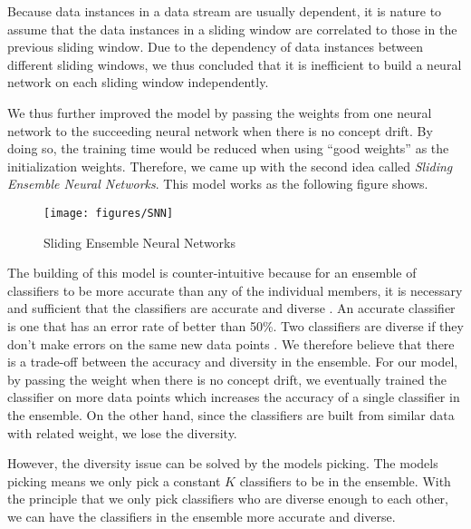 \documentclass[conference]{IEEEtran}
\begin{document}
		Because data instances in a data stream are usually dependent, it is nature to assume that the data instances in a sliding window are correlated to those in the previous sliding window.  Due to the dependency of data instances between different sliding windows, we thus concluded that it is inefficient to build a neural network on each sliding window independently.   
		
		We thus further improved the model by passing the weights from one neural network to the succeeding neural network when there is no concept drift. By doing so, the training time would be reduced when using ``good weights'' as the initialization weights.  Therefore, we came up with the second idea called \emph{Sliding Ensemble Neural Networks}. This model works as the following figure shows.
		
		
		\begin{figure}[H]
			\centering
			\texttt{[image: figures/SNN]}
			\caption{Sliding Ensemble Neural Networks}
			\label{fig:SNN}
		\end{figure}
		
		The building of this model is counter-intuitive because for an ensemble of classifiers to be more accurate than any of the individual members, it is necessary and sufficient that the classifiers are accurate and diverse \cite{Hansen}. An accurate classifier is one that has an error rate of better than 50\%. Two classifiers are diverse if they don't make errors on the same new data points \cite{Dietterich}. We therefore believe that there is a trade-off between the accuracy and diversity in the ensemble. For our model, by passing the weight when there is no concept drift, we eventually trained the classifier on more data points which increases the accuracy of a single classifier in the ensemble. On the other hand, since the classifiers are built from similar data with related weight, we lose the diversity.  
		
		However, the diversity issue can be solved by the models picking. The models picking means we only pick a constant $K$ classifiers to be in the ensemble. With the principle that we only pick classifiers who are diverse enough to each other, we can have the classifiers in the ensemble more accurate and diverse. 
		
\end{document}
